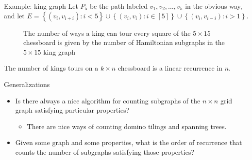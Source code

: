 \documentclass{beamer}%
\newcommand\set[1]{\left\{#1\right\}}
\begin{document}
\begin{frame}{Example: king graph}
  Let $P_5$ be the path labeled $v_1, v_2, \hdots, v_5$ in the obvious way, and let
  $E = \set{(v_i, v_{i+i}) : i < 5} \cup \set{(v_i, v_{i}) : i \in [5]} \cup \set{(v_i, v_{i-i}) : i > 1}$.
  \begin{figure}
    
    \caption{
      The number of ways a king can tour every square of the
      $5 \times 15$ chessboard is given by the number of Hamiltonian
      subgraphs in the $5 \times 15$ king graph
    }
  \end{figure}
  The number of kings tours on a $k \times n$ chessboard is a linear
  recurrence in $n$.
\end{frame}

\begin{frame}{Generalizations}
  \begin{itemize}
    \item Is there always a nice algorithm for counting subgraphs of the
      $n \times n$ grid graph satisfying particular properties?
      \begin{itemize}
        \item There are nice ways of counting domino tilings and spanning trees.
      \end{itemize}
    \item Given some graph and some properties, what is the order of recurrence
      that counts the number of subgraphs satisfying those properties?
  \end{itemize}

\end{frame}
\end{document}
